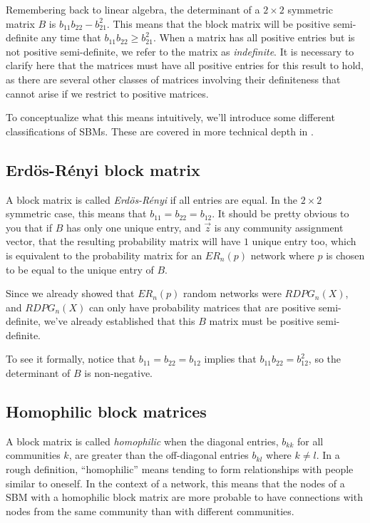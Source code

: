 Remembering back to linear algebra, the determinant of a $2 \times 2$ symmetric matrix $B$ is $b_{11}b_{22} - b_{21}^2$. This means that the block matrix will be positive semi-definite any time that $b_{11}b_{22} \geq b_{21}^2$. When a matrix has all positive entries but is not positive semi-definite, we refer to the matrix as \textit{indefinite}. It is necessary to clarify here that the matrices must have all positive entries for this result to hold, as there are several other classes of matrices involving their definiteness that cannot arise if we restrict to positive matrices.

To conceptualize what this means intuitively, we'll introduce some different classifications of SBMs. These are covered in more technical depth in \cite{Chung2021Mar}.

\subsection{Erd\"os-R\'enyi block matrix}

A block matrix is called \textit{Erd\"os-R\'enyi} if all entries are equal. In the $2 \times 2$ symmetric case, this means that $b_{11} = b_{22} = b_{12}$. It should be pretty obvious to you that if $B$ has only one unique entry, and $\vec z$ is any community assignment vector, that the resulting probability matrix will have $1$ unique entry too, which is equivalent to the probability matrix for an $ER_n(p)$ network where $p$ is chosen to be equal to the unique entry of $B$. 

Since we already showed that $ER_n(p)$ random networks were $RDPG_n(X)$, and $RDPG_n(X)$ can only have probability matrices that are positive semi-definite, we've already established that this $B$ matrix must be positive semi-definite. 

To see it formally, notice that $b_{11} = b_{22} = b_{12}$ implies that $b_{11}b_{22} = b_{12}^2$, so the determinant of $B$ is non-negative.

\subsection{Homophilic block matrices}
\label{sec:ch5:psd_block:homophily}

A block matrix is called \textit{homophilic} when the diagonal entries, $b_{kk}$ for all communities $k$, are greater than the off-diagonal entries $b_{kl}$ where $k \neq l$. In a rough definition, ``homophilic'' means tending to form relationships with people similar to oneself. In the context of a network, this means that the nodes of a SBM with a homophilic block matrix are more probable to have connections with nodes from the same community than with different communities.


